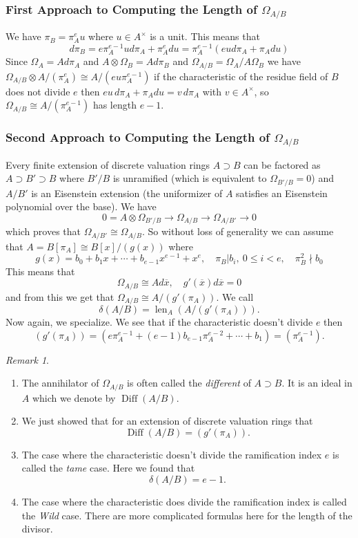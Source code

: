 \documentclass[12pt]{article}
\numberwithin{equation}{section}
\theoremstyle{definition}
\theoremstyle{remark}
\newtheorem{remark}[theorem]{Remark}
\newcommand{\len}{\operatorname{len}}
\begin{document}
\subsubsection{First Approach to Computing the Length of $\Omega_{A/B}$}
We have $\pi_B=\pi_A^e u$ where $u\in A^{\times}$ is a unit. This means that 
 $$ d\pi_B = e\pi_A^{e-1} u d\pi_A + \pi_A^e du = \pi_A^{e-1}( eud\pi_A + \pi_A du) $$
Since $\Omega_A = A d\pi_A$ and $A \otimes \Omega_B = A d\pi_B$ and $\Omega_{A/B} = \Omega_A/A \Omega_B$ we have $\Omega_{A/B} \otimes A/(\pi_A^e) \cong A/(eu\pi_A^{e-1})$ if the characteristic of the residue field of $B$ does not divide $e$ then $eu\,d\pi_A + \pi_A du = v\,d\pi_A$ with $v\in A^{\times}$, so $\Omega_{A/B}\cong A/(\pi_A^{e-1})$ has length $e-1$.
\subsubsection{Second Approach to Computing the Length of $\Omega_{A/B}$}
Every finite extension of discrete valuation rings $A\supset B$ can be factored as $A \supset B' \supset B$ where $B'/B$ is unramified (which is equivalent to $\Omega_{B'/B}=0$) and $A/B'$ is an Eisenstein extension (the uniformizer of $A$ satisfies an Eisenstein polynomial over the base).
We have 
$$0=A\otimes\Omega_{B'/B} \to \Omega_{A/B} \to \Omega_{A/B'} \to 0$$ 
which proves that $\Omega_{A/B'} \cong \Omega_{A/B}$. 
So without loss of generality we can assume that $A = B[\pi_A]\cong B[x]/(g(x))$ where 
 $$ g(x) = b_0 + b_1x + \cdots + b_{e-1}x^{e-1}+ x^e, \quad \pi_B \vert b_i, \ 0 \leq i <e, \quad \pi_B^2 \nmid b_0 $$
This means that 
 $$ \Omega_{A/B} \cong A d\overline{x}, \quad g'(\overline{x}) d\overline{x} =0 $$
and from this we get that $\Omega_{A/B} \cong A/(g'(\pi_A))$. 
We call
 $$ \delta(A/B) = \len_A( A/(g'(\pi_A)) ).$$
Now again, we specialize. 
We see that if the characteristic doesn't divide $e$ then 
 $$ (g'(\pi_A)) = (e\pi_A^{e-1} + (e-1)b_{e-1} \pi_A^{e-2} + \cdots + b_1) = (\pi_A^{e-1}). $$

\begin{remark}
	\begin{enumerate}
		\item 	The annihilator of $\Omega_{A/B}$ is often called the \emph{different} of $A\supset B$. 
		It is an ideal in $A$ which we denote by $\operatorname{Diff}(A/B)$.
		\item  We just showed that for an extension of discrete valuation rings that 
		$$ \operatorname{Diff}(A/B) = (g'(\pi_A)). $$
		\item The case where the characteristic doesn't divide the ramification index $e$ is called the \emph{tame} case. 
		Here we found that 
		 $$ \delta(A/B) = e -1.$$
		\item The case where the characteristic does divide the ramification index is called the \emph{Wild} case. 
		There are more complicated formulas here for the length of the divisor. 
	\end{enumerate}
\end{remark}
\end{document}
